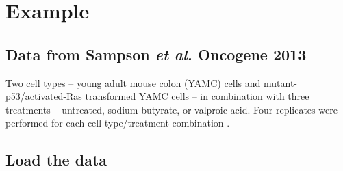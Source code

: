 \documentclass[12pt]{article}
\begin{document}
\section{Example}

\subsection*{Data from Sampson \emph{et al.} Oncogene 2013}
Two cell types -- young adult mouse colon (YAMC) cells and
mutant-p53/activated-Ras transformed YAMC cells -- in combination with
three treatments -- untreated, sodium butyrate, or valproic acid. Four
replicates were performed for each cell-type/treatment combination
\cite{sampson2012gene}.

\subsection*{Load the data}
\end{document}
